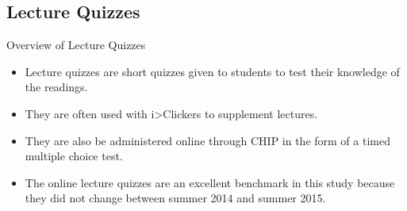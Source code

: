 \documentclass{beamer}
\begin{document}
\subsection*{Lecture Quizzes}

\begin{frame}{Overview of Lecture Quizzes}
  \begin{itemize}
    \item Lecture quizzes are short quizzes given to students to test their knowledge of the readings.
    \item They are often used with i>Clickers to supplement lectures.
    \item They are also be administered online through CHIP in the form of a timed multiple choice test.
    \item The online lecture quizzes are an excellent benchmark in this study because they did not change between summer 2014 and summer 2015.
  \end{itemize}
\end{frame}
\end{document}
